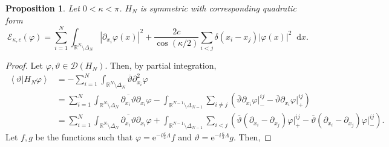 \documentclass[a4paper,11pt]{article}
\newcommand{\euler}[1]{\text{e}^{#1}}
\newcommand{\abs}[1]{\left\lvert #1 \right\rvert}
\renewcommand{\braket}[1]{\left\langle#1\right\rangle}
\newcommand*\diff{\mathop{}\!\mathrm{d}}
\newcommand{\R}{\mathbb{R}}
\newtheorem{proposition}[theorem]{Proposition}
\numberwithin{equation}{section}
\begin{document}
\begin{proposition}\label{PropositionAnyonQuadraticForm}
				Let $0<\kappa<\pi$. $ H_N $ is symmetric with corresponding quadratic form \begin{equation}
				\mathcal{E}_{\kappa,c}(\varphi)=\sum_{i=1}^{N}\int_{{\R^N\setminus\Delta_N}} \abs{\partial_{x_i}\varphi(x)}^2+\frac{2c}{\cos(\kappa/2)}\sum_{i<j} \delta(x_i-x_j)\abs{\varphi(x)}^2\diff x.
				\end{equation}
			\end{proposition}
			\begin{proof}
				Let $ \varphi,\vartheta\in \mathcal{D}(H_N) $. Then, by partial integration, \begin{equation}
				\begin{aligned}
				\braket{\vartheta\vert H_N \varphi}&=-\sum_{i=1}^{N}\int_{\R^N\setminus\Delta_N}\overline{\vartheta} \partial_{x_i}^2\varphi\\&=\sum_{i=1}^{N}\int_{\R^N\setminus\Delta_N}\overline{\partial_{x_i}\vartheta}\partial_{x_i}\varphi-\int_{\R^{N-1}\setminus\Delta_{N-1}}\sum_{i\neq j}\left(\overline{\vartheta}\partial_{x_i}\varphi\vert^{ij}_--\overline{\vartheta}\partial_{x_i}\varphi\vert^{ij}_+\right)\\
				&=\sum_{i=1}^{N}\int_{\R^N\setminus\Delta_N}\overline{\partial_{x_i}\vartheta}\partial_{x_i}\varphi+\int_{\R^{N-1}\setminus\Delta_{N-1}}\sum_{i< j}\left(\overline{\vartheta}(\partial_{x_i}-\partial_{x_j})\varphi\vert^{ij}_+-\overline{\vartheta}(\partial_{x_i}-\partial_{x_j})\varphi\vert^{ij}_-\right).
				\end{aligned}
				\end{equation}
				Let $ f,g$ be the functions such that $ \varphi=\euler{-i\frac{\kappa}{2}\Lambda}f $ and $ \vartheta=\euler{-i\frac{\kappa}{2}\Lambda}g $. Then,
				

\end{proof}
\end{document}

